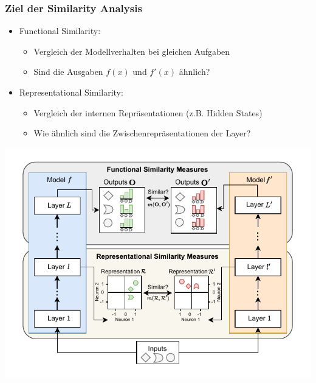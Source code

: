 
\begingroup
\frametitle{ Ziel der Similarity Analysis}
\begin{frame}
	
	\begin{minipage}[t]{0.48\linewidth}
		\vspace*{-0.5em}
  \begin{itemize}
	\item Functional Similarity:
	\begin{itemize}
		\item Vergleich der Modellverhalten bei gleichen Aufgaben
		\item Sind die Ausgaben \( f(x) \) und \( f'(x) \) ähnlich?
	\end{itemize}
	\vspace{1em}
	\item Representational Similarity:
	\begin{itemize}
		\item Vergleich der internen Repräsentationen (z.B. Hidden States)
		\item Wie ähnlich sind die Zwischenrepräsentationen der Layer?
	\end{itemize}
\end{itemize}
	\end{minipage}
	\hfill
	\begin{minipage}[t]{0.49\linewidth}
		\vspace*{-0.5em}
		\includegraphics[width=1.2\linewidth]{BilderPräsentation/Similarity90Deg.drawio.pdf}
	\end{minipage}
	
\end{frame}
\endgroup


